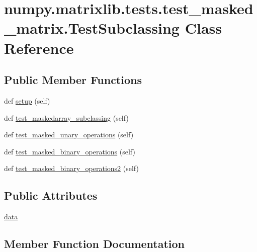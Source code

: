 \hypertarget{classnumpy_1_1matrixlib_1_1tests_1_1test__masked__matrix_1_1TestSubclassing}{}\section{numpy.\+matrixlib.\+tests.\+test\+\_\+masked\+\_\+matrix.\+Test\+Subclassing Class Reference}
\label{classnumpy_1_1matrixlib_1_1tests_1_1test__masked__matrix_1_1TestSubclassing}
\subsection*{Public Member Functions}
\begin{DoxyCompactItemize}
\item 
def \hyperlink{classnumpy_1_1matrixlib_1_1tests_1_1test__masked__matrix_1_1TestSubclassing_ab77dc4318c577d6c66b0c01586d61707}{setup} (self)
\item 
def \hyperlink{classnumpy_1_1matrixlib_1_1tests_1_1test__masked__matrix_1_1TestSubclassing_ab57249fc0064bacbb392d745b761dc81}{test\+\_\+maskedarray\+\_\+subclassing} (self)
\item 
def \hyperlink{classnumpy_1_1matrixlib_1_1tests_1_1test__masked__matrix_1_1TestSubclassing_a0142df947289835fefd3b4e788ad26f7}{test\+\_\+masked\+\_\+unary\+\_\+operations} (self)
\item 
def \hyperlink{classnumpy_1_1matrixlib_1_1tests_1_1test__masked__matrix_1_1TestSubclassing_a436a40d4963ba819b3de199e9dd5a9e3}{test\+\_\+masked\+\_\+binary\+\_\+operations} (self)
\item 
def \hyperlink{classnumpy_1_1matrixlib_1_1tests_1_1test__masked__matrix_1_1TestSubclassing_a798de669a93953cb8703edf594171503}{test\+\_\+masked\+\_\+binary\+\_\+operations2} (self)
\end{DoxyCompactItemize}
\subsection*{Public Attributes}
\begin{DoxyCompactItemize}
\item 
\hyperlink{classnumpy_1_1matrixlib_1_1tests_1_1test__masked__matrix_1_1TestSubclassing_afc6746f65c5f2d113fba7598a6ccc4a7}{data}
\end{DoxyCompactItemize}


\subsection{Member Function Documentation}
\mbox{\label{classnumpy_1_1matrixlib_1_1tests_1_1test__masked__matrix_1_1TestSubclassing_ab77dc4318c577d6c66b0c01586d61707}} 
